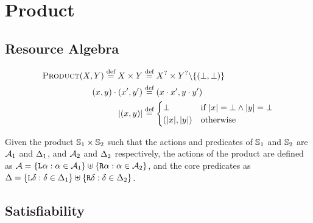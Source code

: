 
\section{Product} \label{rules:product}

\subsection{Resource Algebra}

\begin{align*}
	\textsc{Product}(X,Y) \stackrel{\textnormal{def}}= X \times Y &\stackrel{\textnormal{def}}= X^? \times Y^? \backslash \{(\bot, \bot)\}\\
	(x, y) \cdot (x', y') &\stackrel{\textnormal{def}}= (x \cdot x', y \cdot y')\\
	|(x, y)| &\stackrel{\textnormal{def}}= \begin{cases}
		\bot &\text{if}~|x|=\bot\land |y|=\bot\\
		(|x|, |y|) &\text{otherwise}
 	\end{cases}
\end{align*}

Given the product $\mathbb S_1 \times \mathbb S_2$ such that the actions and predicates of $\mathbb S_1$ and $\mathbb S_2$ are ${\cal{A}}_1$ and $\Delta_1$, and ${\cal{A}}_2$ and $\Delta_2$ respectively, the actions of the product are defined as ${{\cal{A}} = \{\texttt{L}\alpha : \alpha \in {\ensuremath{\cal{A}}}_1 \} \uplus \{\texttt{R}\alpha : \alpha \in {\ensuremath{\cal{A}}}_2 \}}$, and the core predicates as ${\Delta = \{\texttt{L}\delta : \delta \in \Delta_1 \} \uplus \{\texttt{R}\delta : \delta \in \Delta_2 \}}$.

\subsection{Satisfiability}

